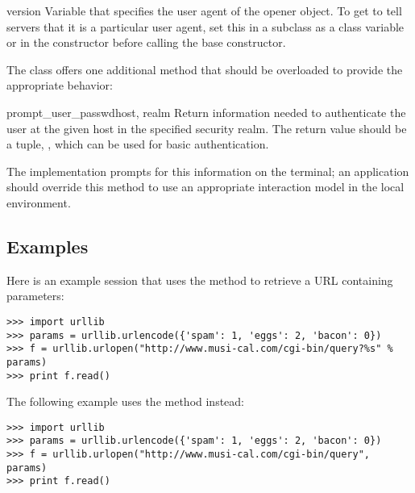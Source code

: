\begin{memberdesc}[URLopener]{version}
Variable that specifies the user agent of the opener object.  To get
 to tell servers that it is a particular user agent,
set this in a subclass as a class variable or in the constructor
before calling the base constructor.
\end{memberdesc}

The  class offers one additional method that
should be overloaded to provide the appropriate behavior:

\begin{methoddesc}[FancyURLopener]{prompt_user_passwd}{host, realm}
Return information needed to authenticate the user at the given host
in the specified security realm.  The return value should be a tuple,
, which can be used for basic
authentication.

The implementation prompts for this information on the terminal; an
application should override this method to use an appropriate
interaction model in the local environment.
\end{methoddesc}


\subsection{Examples}

Here is an example session that uses the  method to retrieve
a URL containing parameters:

\begin{verbatim}
>>> import urllib
>>> params = urllib.urlencode({'spam': 1, 'eggs': 2, 'bacon': 0})
>>> f = urllib.urlopen("http://www.musi-cal.com/cgi-bin/query?%s" % params)
>>> print f.read()
\end{verbatim}

The following example uses the  method instead:

\begin{verbatim}
>>> import urllib
>>> params = urllib.urlencode({'spam': 1, 'eggs': 2, 'bacon': 0})
>>> f = urllib.urlopen("http://www.musi-cal.com/cgi-bin/query", params)
>>> print f.read()
\end{verbatim}
